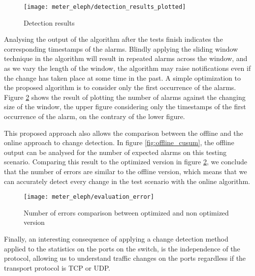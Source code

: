 \begin{figure}
    \centering
    \texttt{[image: meter\_eleph/detection\_results\_plotted]}
    \caption{Detection results}
    \label{fig:color_plot}
\end{figure}

\par Analysing the output of the algorithm after the tests finish indicates the corresponding timestamps of the alarms. Blindly applying the sliding window technique
in the algorithm will result in repeated alarms across the window, and as we vary the length of the window, the algorithm may raise notifications even if the change
has taken place at some time in the past. A simple optimization to the proposed algorithm is to consider only the first occurrence of the alarms. Figure
\ref{fig:errors_comparaison} shows the result of plotting the number of alarms against the changing size of the window, the upper figure considering only the
timestamps of the first occurrence of the alarm, on the contrary of the lower figure.

\par This proposed approach also allows the comparison between the offline and the online approach to change detection. In figure \ref{fig:offline_cusum}, the 
offline output can be analysed for the number of expected alarms on this testing scenario. Comparing this result to the optimized version in figure 
\ref{fig:errors_comparaison}, we conclude that the number of errors are similar to the offline version, which means that we can accurately detect every change in
the test scenario with the online algorithm.

\begin{figure} [H]
    \centering
    \texttt{[image: meter\_eleph/evaluation\_error]}
    \caption {Number of errors comparison between optimized and non optimized version}
    \label{fig:errors_comparaison}
\end{figure} 

\par Finally, an interesting consequence of applying a change detection method applied to the statistics on the ports on the switch, is the independence of the 
protocol, allowing us to understand traffic changes on the ports regardless if the transport protocol is TCP or UDP.

